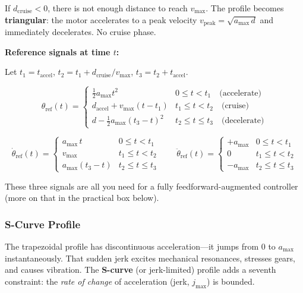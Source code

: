 If $d_{\text{cruise}} < 0$, there is not enough distance to reach $v_{\max}$. The profile becomes \textbf{triangular}: the motor accelerates to a peak velocity $v_{\text{peak}} = \sqrt{a_{\max}\,d}$ and immediately decelerates. No cruise phase.

\textbf{Reference signals at time $t$:}

Let $t_1 = t_{\text{accel}}$, $t_2 = t_1 + d_{\text{cruise}}/v_{\max}$, $t_3 = t_2 + t_{\text{accel}}$.

\begin{equation}
\theta_{\text{ref}}(t) = \begin{cases}
\tfrac{1}{2}a_{\max}t^2 & 0 \le t < t_1 \quad \text{(accelerate)}\\[4pt]
d_{\text{accel}} + v_{\max}(t - t_1) & t_1 \le t < t_2 \quad \text{(cruise)}\\[4pt]
d - \tfrac{1}{2}a_{\max}(t_3-t)^2 & t_2 \le t \le t_3 \quad \text{(decelerate)}
\end{cases}
\end{equation}

\begin{equation}
\dot{\theta}_{\text{ref}}(t) = \begin{cases}
a_{\max}\,t & 0 \le t < t_1 \\
v_{\max} & t_1 \le t < t_2 \\
a_{\max}(t_3 - t) & t_2 \le t \le t_3
\end{cases}
\qquad
\ddot{\theta}_{\text{ref}}(t) = \begin{cases}
+a_{\max} & 0 \le t < t_1 \\
0 & t_1 \le t < t_2 \\
-a_{\max} & t_2 \le t \le t_3
\end{cases}
\end{equation}

These three signals are all you need for a fully feedforward-augmented controller (more on that in the practical box below).

\subsubsection{S-Curve Profile}

The trapezoidal profile has discontinuous acceleration---it jumps from $0$ to $a_{\max}$ instantaneously. That sudden jerk excites mechanical resonances, stresses gears, and causes vibration. The \textbf{S-curve} (or jerk-limited) profile adds a seventh constraint: the \emph{rate of change} of acceleration (jerk, $j_{\max}$) is bounded.

